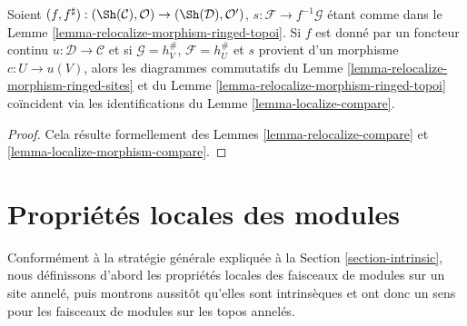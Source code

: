 \begin{lemma}
\label{lemma-relocalize-morphism-compare}
Soient
$(f, f^\sharp) :
(\Sh(\mathcal{C}), \mathcal{O})
\to
(\Sh(\mathcal{D}), \mathcal{O}')$,
$s : \mathcal{F} \to f^{-1}\mathcal{G}$ étant comme dans le
Lemme \ref{lemma-relocalize-morphism-ringed-topoi}.
Si $f$ est donné par un foncteur continu
$u : \mathcal{D} \to \mathcal{C}$
et si $\mathcal{G} = h_V^\#$, $\mathcal{F} = h_U^\#$ et $s$ provient d'un
morphisme $c : U \to u(V)$, alors les diagrammes commutatifs du
Lemme \ref{lemma-relocalize-morphism-ringed-sites}
et du
Lemme \ref{lemma-relocalize-morphism-ringed-topoi}
coïncident via les identifications du
Lemme \ref{lemma-localize-compare}.
\end{lemma}

\begin{proof}
Cela résulte formellement des
Lemmes \ref{lemma-relocalize-compare} et
\ref{lemma-localize-morphism-compare}.
\end{proof}

















\section{Propriétés locales des modules}
\label{section-local}

\noindent
Conformément à la stratégie générale expliquée à la
Section \ref{section-intrinsic}, nous définissons d'abord les propriétés
locales des faisceaux de modules sur un site annelé, puis montrons aussitôt
qu'elles sont intrinsèques et ont donc un sens pour les faisceaux de modules
sur les topos annelés.

